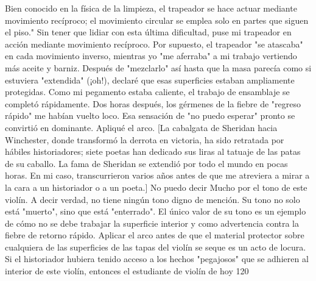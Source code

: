 Bien conocido en la física de la limpieza, el trapeador se hace actuar mediante movimiento recíproco; el movimiento circular se emplea solo en partes que siguen el piso." Sin tener que lidiar con esta última dificultad, puse mi trapeador en acción mediante movimiento recíproco. Por supuesto, el trapeador "se atascaba" en cada movimiento inverso, mientras yo "me aferraba" a mi trabajo vertiendo más aceite y barniz. Después de "mezclarlo" así hasta que la masa parecía como si estuviera "extendida" (¡oh!), declaré que esas superficies estaban ampliamente protegidas. Como mi pegamento estaba caliente, el trabajo de ensamblaje se completó rápidamente. Dos horas después, los gérmenes de la fiebre de "regreso rápido" me habían vuelto loco. Esa sensación de "no puedo esperar" pronto se convirtió en dominante. Apliqué el arco.
[La cabalgata de Sheridan hacia Winchester, donde transformó la derrota en victoria, ha sido retratada por hábiles historiadores; siete poetas han dedicado sus liras al tatuaje de las patas de su caballo. La fama de Sheridan se extendió por todo el mundo en pocas horas. En mi caso, transcurrieron varios años antes de que me atreviera a mirar a la cara a un historiador o a un poeta.] No puedo decir
Mucho por el tono de este violín. A decir verdad, no tiene ningún tono digno de mención. Su tono no solo está "muerto", sino que está "enterrado". El único valor de su tono es un ejemplo de cómo no se debe trabajar la superficie interior y como advertencia contra la fiebre de retorno rápido. Aplicar el arco antes de que el material protector sobre cualquiera de las superficies de las tapas del violín se seque es un acto de locura. Si el historiador hubiera tenido acceso a los hechos "pegajosos" que se adhieren al interior de este violín, entonces el estudiante de violín de hoy 120

